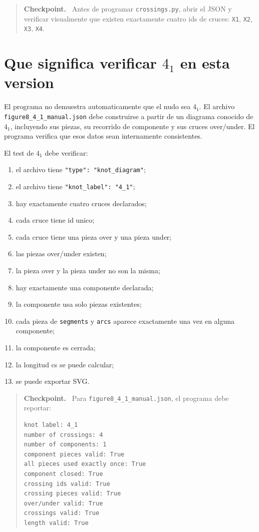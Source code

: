 \documentclass[11pt,letterpaper]{amsart}
\newenvironment{checkpoint}
{\par\medskip\noindent\begin{quote}\textbf{Checkpoint.}\ }
{\end{quote}\par\medskip}
\begin{document}
\begin{checkpoint}
Antes de programar \texttt{crossings.py}, abrir el JSON y verificar visualmente
que existen exactamente cuatro ids de cruces: \texttt{X1}, \texttt{X2},
\texttt{X3}, \texttt{X4}.
\end{checkpoint}

\section{Que significa verificar \(4_1\) en esta version}

El programa no demuestra automaticamente que el nudo sea \(4_1\). El archivo
\texttt{figure8\_4\_1\_manual.json} debe construirse a partir de un diagrama
conocido de \(4_1\), incluyendo sus piezas, su recorrido de componente y sus
cruces over/under. El programa verifica que esos datos sean internamente
consistentes.

El test de \(4_1\) debe verificar:

\begin{enumerate}[label=\textbf{\arabic*.}]
\item el archivo tiene \texttt{"type": "knot\_diagram"};
\item el archivo tiene \texttt{"knot\_label": "4\_1"};
\item hay exactamente cuatro cruces declarados;
\item cada cruce tiene id unico;
\item cada cruce tiene una pieza over y una pieza under;
\item las piezas over/under existen;
\item la pieza over y la pieza under no son la misma;
\item hay exactamente una componente declarada;
\item la componente usa solo piezas existentes;
\item cada pieza de \texttt{segments} y \texttt{arcs} aparece exactamente una vez
en alguna componente;
\item la componente es cerrada;
\item la longitud cs se puede calcular;
\item se puede exportar SVG.
\end{enumerate}

\begin{checkpoint}
Para \texttt{figure8\_4\_1\_manual.json}, el programa debe reportar:
\begin{verbatim}
knot label: 4_1
number of crossings: 4
number of components: 1
component pieces valid: True
all pieces used exactly once: True
component closed: True
crossing ids valid: True
crossing pieces valid: True
over/under valid: True
crossings valid: True
length valid: True
\end{verbatim}
\end{checkpoint}
\end{document}
